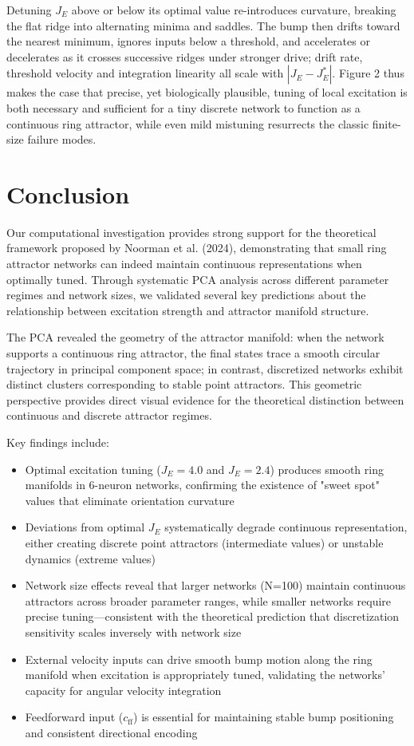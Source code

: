 \documentclass[11pt,a4paper]{article}
\begin{document}
Detuning \(J_E\) above or below its optimal value re-introduces curvature, breaking the flat ridge into alternating minima and saddles.  The bump then drifts toward the nearest minimum, ignores inputs below a threshold, and accelerates or decelerates as it crosses successive ridges under stronger drive; drift rate, threshold velocity and integration linearity all scale with \(|J_E-J_E^{\!*}|\).  Figure 2 thus makes the case that precise, yet biologically plausible, tuning of local excitation is both necessary and sufficient for a tiny discrete network to function as a continuous ring attractor, while even mild mistuning resurrects the classic finite-size failure modes.

\section{Conclusion}

Our computational investigation provides strong support for the theoretical framework proposed by Noorman et al. (2024), demonstrating that small ring attractor networks can indeed maintain continuous representations when optimally tuned. Through systematic PCA analysis across different parameter regimes and network sizes, we validated several key predictions about the relationship between excitation strength and attractor manifold structure.

The PCA revealed the geometry of the attractor manifold: when the network supports a continuous ring attractor, the final states trace a smooth circular trajectory in principal component space; in contrast, discretized networks exhibit distinct clusters corresponding to stable point attractors. This geometric perspective provides direct visual evidence for the theoretical distinction between continuous and discrete attractor regimes.

Key findings include:
\begin{itemize}
\item Optimal excitation tuning (\(J_E = 4.0\) and \(J_E = 2.4\)) produces smooth ring manifolds in 6-neuron networks, confirming the existence of "sweet spot" values that eliminate orientation curvature
\item Deviations from optimal \(J_E\) systematically degrade continuous representation, either creating discrete point attractors (intermediate values) or unstable dynamics (extreme values)
\item Network size effects reveal that larger networks (N=100) maintain continuous attractors across broader parameter ranges, while smaller networks require precise tuning—consistent with the theoretical prediction that discretization sensitivity scales inversely with network size
\item External velocity inputs can drive smooth bump motion along the ring manifold when excitation is appropriately tuned, validating the networks' capacity for angular velocity integration
\item Feedforward input (\(c_{\text{ff}}\)) is essential for maintaining stable bump positioning and consistent directional encoding
\end{itemize}
\end{document}
